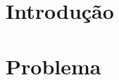 \documentclass[11pt,oneside,a4paper,english,french,spanish,brazil]{abntex2}
\begin{document}


            \frenchspacing

          \pagestyle{modalpre}

            
            \clearpage

            
            \clearpage

            \vspace{1cm}
            \tableofcontents

            \clearpage
            \vspace{1cm}
            \listoffigures

            \vspace{1cm}
            \listoftables

            \clearpage

          \pagestyle{modal}

            \chapter{Introdução}\label{cap:introducao}
            

            \chapter{Problema}\label{cap:problema}
            

\end{document}
